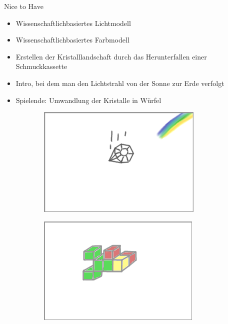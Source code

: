 \slideonetoone
{Nice to Have}
{
	\begin{itemize}
		\item Wissenschaftlichbasiertes Lichtmodell 
		\item Wissenschaftlichbasiertes Farbmodell
		\item Erstellen der Kristalllandschaft durch das Herunterfallen einer Schmuckkassette
		\item Intro, bei dem man den Lichtstrahl von der Sonne zur Erde verfolgt
		\item Spielende: Umwandlung der Kristalle in Würfel
	\end{itemize}
}
{
	\begin{figure}
		\centering
		\begin{subfigure}{\textwidth}
			\centering
			\includegraphics[width=\textwidth, height=0.35\textheight, keepaspectratio]{images/Skizzen/intro}
		\end{subfigure}
		\begin{subfigure}{\textwidth}
			\centering
			\includegraphics[width=\textwidth, height=0.35\textheight, keepaspectratio]{images/Skizzen/ende}
		\end{subfigure}
	\end{figure}
}

